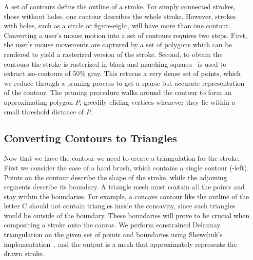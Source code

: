 \documentclass[review,draft]{acmsiggraph}
\begin{document}
A set of contours define the outline of a stroke. For simply connected strokes, those without holes, 
one contour describes the whole stroke. However, strokes with holes, such as a circle or 
figure-eight, will have more than one contour.
Converting a user's mouse motion into a set of contours requires two steps.
First, the user's mouse movements are captured by a set of polygons which can be
rendered to yield a rasterized version of the stroke.
Second, to obtain the contours the stroke is rasterized in black and marching squares~\cite{lorensen1987}
is used to extract iso-contours of 50\% gray. This returns a very dense set of points,
which we reduce through a pruning process to
get a sparse but accurate representation of the contour.
The pruning procedure walks around the contour to form an approximating polygon $P$,
greedily eliding vertices whenever they lie within a small threshold distance of $P$.



\subsection{Converting Contours to Triangles}
\label{sec:contours}

Now that we have the contour we need to create a triangulation for the stroke. 
First we consider the case of a hard brush, which contains a single contour (-left).
Points on the contour describe the shape of the stroke, while the adjoining segments
describe its boundary.
A triangle mesh must contain all the points and stay
within the boundaries. 
For example, a concave contour like the outline of the letter C should not contain 
triangles inside the concavity, since such triangles would be outside of the boundary.
These boundaries will prove to be crucial when compositing a stroke onto the canvas.
%
We perform constrained Delaunay triangulation on the given set of points and boundaries using
Shewchuk's implementation~, and the output is a mesh that
approximately represents the drawn stroke.
\end{document}
